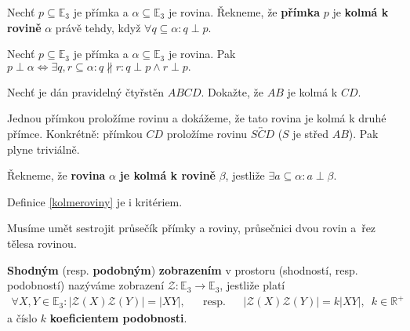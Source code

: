\begin{definition}
    Nechť $p\subseteq \mathbb E_3$ je přímka a $\alpha \subseteq \mathbb E_3$ je rovina.
    Řekneme, že \textbf{přímka} $p$ je \textbf{kolmá k rovině} $\alpha$ právě tehdy,
    když $\forall q \subseteq \alpha: q \perp p.$
\end{definition}

\begin{veta}
    Nechť $p\subseteq \mathbb E_3$ je přímka a $\alpha \subseteq \mathbb E_3$ je rovina.
    Pak  $p\perp \alpha \iff \exists q,r \subseteq \alpha: q \nparallel r: q\perp p\land
    r\perp p.$
\end{veta}

\begin{priklad}
Nechť je dán pravidelný čtyřstěn $ABCD$. Dokažte, že $AB$ je kolmá k $CD$.
\end{priklad}

\begin{reseni}
Jednou přímkou proložíme rovinu a dokážeme, že tato rovina je kolmá k druhé přímce.
Konkrétně: přímkou $CD$ proložíme rovinu $\overleftrightarrow{SCD}$ ($S$ je střed
$AB$). Pak plyne triviálně.
\end{reseni}

\begin{definition}\label{kolmeroviny}
    Řekneme, že \textbf{rovina} $\alpha$ \textbf{je kolmá k rovině} $\beta$, jestliže
    $\exists a\subseteq\alpha: a \perp\beta.$
\end{definition}

\begin{pozn}
    Definice \ref{kolmeroviny} je i kritériem.
\end{pozn}

\begin{pozn}
    Musíme umět sestrojit průsečík přímky a roviny, průsečnici dvou rovin a~řez
    tělesa rovinou.
\end{pozn}

\begin{definition}
\textbf{Shodným} (resp. \textbf{podobným}) \textbf{zobrazením} v prostoru (shodností,
resp. podobností) nazýváme zobrazení $\mathscr Z:
\mathbb E_3 \to \mathbb E_3$, jestliže platí
\begin{align*}
    \forall X, Y \in \mathbb E_3: |\mathscr Z(X)\mathscr Z(Y)| =|XY|, & & \textrm{resp.} & & |\mathscr Z(X)\mathscr Z(Y)|=k|XY|, \,\,\, k \in \mathbb R^+
\end{align*}
a číslo $k$ \textbf{koeficientem podobnosti}.
\end{definition}

